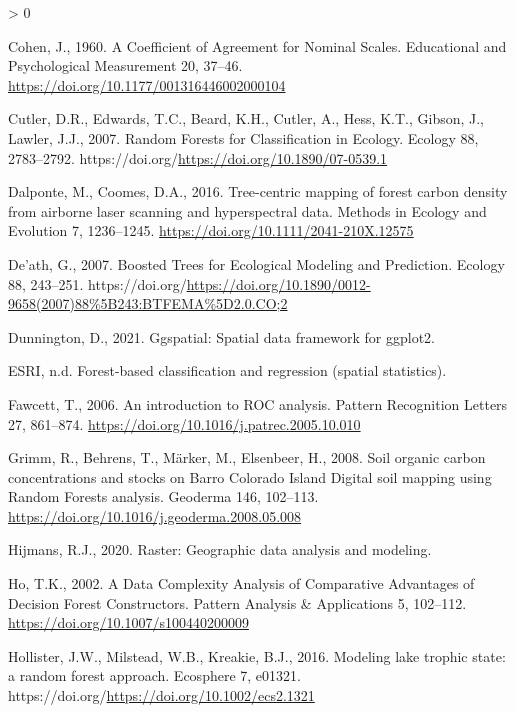 \documentclass[
]{article}
\newlength{\cslhangindent}
\newenvironment{CSLReferences}[2] %
 {%
  \setlength{\parindent}{0pt}
  \ifodd #1 \everypar{\setlength{\hangindent}{\cslhangindent}}\ignorespaces\fi
  \ifnum #2 > 0
  \setlength{\parskip}{#2\baselineskip}
  \fi
 }%
 {}
\begin{document}
\begin{CSLReferences}{1}{0}
\leavevmode\hypertarget{ref-cohen1960}{}%
Cohen, J., 1960. A Coefficient of Agreement for Nominal Scales. Educational and Psychological Measurement 20, 37--46. \url{https://doi.org/10.1177/001316446002000104}

\leavevmode\hypertarget{ref-cutler2007}{}%
Cutler, D.R., Edwards, T.C., Beard, K.H., Cutler, A., Hess, K.T., Gibson, J., Lawler, J.J., 2007. Random Forests for Classification in Ecology. Ecology 88, 2783--2792. https://doi.org/\url{https://doi.org/10.1890/07-0539.1}

\leavevmode\hypertarget{ref-dalponte2016}{}%
Dalponte, M., Coomes, D.A., 2016. Tree-centric mapping of forest carbon density from airborne laser scanning and hyperspectral data. Methods in Ecology and Evolution 7, 1236--1245. \url{https://doi.org/10.1111/2041-210X.12575}

\leavevmode\hypertarget{ref-death2007}{}%
De'ath, G., 2007. Boosted Trees for Ecological Modeling and Prediction. Ecology 88, 243--251. https://doi.org/\url{https://doi.org/10.1890/0012-9658(2007)88\%5B243:BTFEMA\%5D2.0.CO;2}

\leavevmode\hypertarget{ref-R-ggspatial}{}%
Dunnington, D., 2021. Ggspatial: Spatial data framework for ggplot2.

\leavevmode\hypertarget{ref-esri}{}%
ESRI, n.d. Forest-based classification and regression (spatial statistics).

\leavevmode\hypertarget{ref-fawcett2006}{}%
Fawcett, T., 2006. An introduction to ROC analysis. Pattern Recognition Letters 27, 861--874. \url{https://doi.org/10.1016/j.patrec.2005.10.010}

\leavevmode\hypertarget{ref-grimm2008}{}%
Grimm, R., Behrens, T., Märker, M., Elsenbeer, H., 2008. Soil organic carbon concentrations and stocks on Barro Colorado Island {{}} Digital soil mapping using Random Forests analysis. Geoderma 146, 102--113. \url{https://doi.org/10.1016/j.geoderma.2008.05.008}

\leavevmode\hypertarget{ref-R-raster}{}%
Hijmans, R.J., 2020. Raster: Geographic data analysis and modeling.

\leavevmode\hypertarget{ref-ho2002}{}%
Ho, T.K., 2002. A Data Complexity Analysis of Comparative Advantages of Decision Forest Constructors. Pattern Analysis \& Applications 5, 102--112. \url{https://doi.org/10.1007/s100440200009}

\leavevmode\hypertarget{ref-hollister2016}{}%
Hollister, J.W., Milstead, W.B., Kreakie, B.J., 2016. Modeling lake trophic state: a random forest approach. Ecosphere 7, e01321. https://doi.org/\url{https://doi.org/10.1002/ecs2.1321}


\end{CSLReferences}
\end{document}
